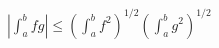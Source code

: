$\displaystyle
\left|\int_a^b fg\right| \leq \left(\int_a^b 
f^2\right)^{1/2}\left(\int_a^b g^2\right)^{1/2}
$